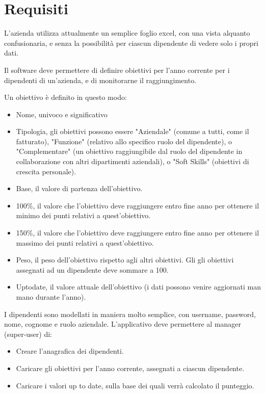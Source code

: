 \section*{Requisiti}

L'azienda utilizza attualmente un semplice foglio excel, con una vista alquanto confusionaria, e senza la possibilità per ciascun dipendente di vedere solo i propri dati.

Il software deve permettere di definire obiettivi per l'anno corrente per i dipendenti di un'azienda, e di monitorarne il raggiungimento.

Un obiettivo è definito in questo modo:
\begin{itemize}
    \item Nome, univoco e significativo
    \item Tipologia, gli obiettivi possono essere "Aziendale" (comune a tutti, come il fatturato), "Funzione" (relativo allo specifico ruolo del dipendente), o "Complementare" (un obiettivo raggiungibile dal ruolo del dipendente in collaborazione con altri dipartimenti aziendali), o "Soft Skills" (obiettivi di crescita personale).
    \item Base, il valore di partenza dell'obiettivo.
    \item 100\%, il valore che l'obiettivo deve raggiungere entro fine anno per ottenere il minimo dei punti relativi a quest'obiettivo.
    \item 150\%, il valore che l'obiettivo deve raggiungere entro fine anno per ottenere il massimo dei punti relativi a quest'obiettivo.
    \item Peso, il peso dell'obiettivo rispetto agli altri obiettivi. Gli gli obiettivi assegnati ad un dipendente deve sommare a 100.
    \item Uptodate, il valore attuale dell'obiettivo (i dati possono venire aggiornati man mano durante l'anno).
\end{itemize}

I dipendenti sono modellati in maniera molto semplice, con username, password, nome, cognome e ruolo aziendale.
L'applicativo deve permettere al manager (super-user) di:

\begin{itemize}
    \item Creare l'anagrafica dei dipendenti.
    \item Caricare gli obiettivi per l'anno corrente, assegnati a ciascun dipendente.
    \item Caricare i valori up to date, sulla base dei quali verrà calcolato il punteggio.
\end{itemize}

